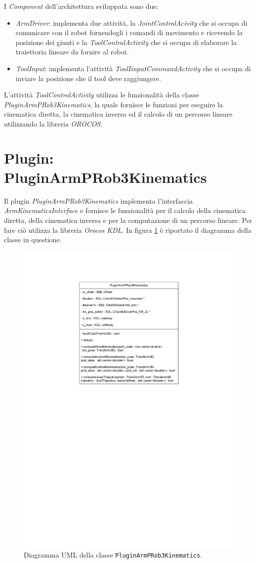 I \textit{Component} dell'architettura sviluppata sono due:
\begin{itemize}
	\item \textit{ArmDriver}: implementa due attività, la \textit{JointControlAcivity} che si occupa di comunicare con il robot fornendogli i comandi di movimento e ricevendo la posizione dei giunti e la \textit{ToolControlActivity} che si occupa di elaborare la traiettoria lineare da fornire al robot. 
	\item \textit{ToolInput}: implementa l'attività \textit{ToolIinputCommandActivity} che si occupa di inviare la posizione che il tool deve raggiungere.
\end{itemize}
\noindent
L'attività \textit{ToolControlActivity} utilizza le funzionalità della classe \textit{PluginArmPRob3Kinematics}, la quale fornisce le funzioni per eseguire la cinematica diretta, la cinematica inversa ed il calcolo di un percorso lineare utilizzando la libreria \textit{OROCOS}.


\section{Plugin: PluginArmPRob3Kinematics}
Il plugin \textit{PluginArmPRob3Kinematics} implementa l'interfaccia \textit{ArmKinematicsInterface} e fornisce le funzionalità per il calcolo della cinematica diretta, della cinematica inversa e per la computazione di un percorso lineare. Per fare ciò utilizza la libreria \textit{Orocos KDL}. 
In figura \ref{fig:plugin_uml} è riportato il diagramma della classe in questione.

\begin{figure}[ht!]
	\centering
	\includegraphics[width=0.5\linewidth]{./ImageFiles/PluginArmPRob3Kinematics.drawio.pdf}
	\caption{Diagramma UML della classe \texttt{PluginArmPRob3Kinematics}.}
	\label{fig:plugin_uml}
\end{figure}

